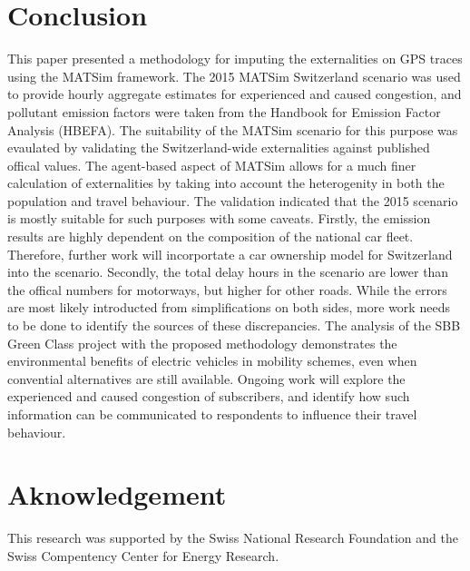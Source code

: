 \section{Conclusion}
This paper presented a methodology for imputing the externalities on GPS traces using the MATSim framework. 
The 2015 MATSim Switzerland scenario was used to provide hourly aggregate estimates for experienced and caused congestion, and pollutant emission factors were taken from the Handbook for Emission Factor Analysis (HBEFA). 
The suitability of the MATSim scenario for this purpose was evaulated by validating the Switzerland-wide externalities against published offical values. 
The agent-based aspect of MATSim allows for a much finer calculation of externalities by taking into account the heterogenity in both the population and travel behaviour. 
The validation indicated that the 2015 scenario is mostly suitable for such purposes with some caveats. 
Firstly, the emission results are highly dependent on the composition of the national car fleet. 
Therefore, further work will incorportate a car ownership model for Switzerland into the scenario.
Secondly, the total delay hours in the scenario are lower than the offical numbers for motorways, but higher for other roads. 
While the errors are most likely introducted from simplifications on both sides, more work needs to be done to identify the sources of these discrepancies.
The analysis of the SBB Green Class project with the proposed methodology demonstrates the environmental benefits of electric vehicles in mobility schemes, even when convential alternatives are still available.
Ongoing work will explore the experienced and caused congestion of subscribers, and identify how such information can be communicated to respondents to influence their travel behaviour. 

\section{Aknowledgement}
This research was supported by the Swiss National Research Foundation and the Swiss Compentency Center for Energy Research.

